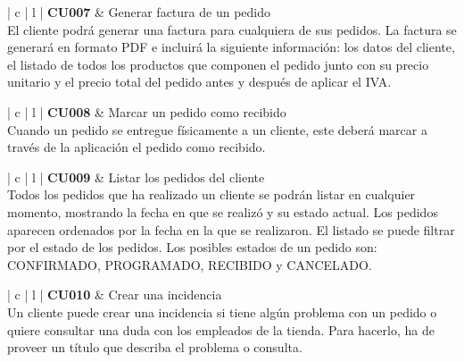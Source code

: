 \documentclass[11pt,spanish,listoffigures]{tfgetsinf}
\begin{document}
\begin{center}
\begin{tabular}{ | c | l | }
\hline
\textbf{ CU007 } & Generar factura de un pedido \\
\hline
{}
{
El cliente podrá generar una factura para cualquiera de sus pedidos. La factura se generará en formato PDF e incluirá la siguiente información: los datos del cliente, el listado de todos los productos que componen el pedido junto con su precio unitario y el precio total del pedido antes y después de aplicar el IVA.
} \\
\hline
\end{tabular}
\end{center}

\begin{center}
\begin{tabular}{ | c | l | }
\hline
\textbf{ CU008 } & Marcar un pedido como recibido \\
\hline
{}
{
Cuando un pedido se entregue físicamente a un cliente, este deberá marcar a través de la aplicación el pedido como recibido.
} \\
\hline
\end{tabular}
\end{center}

\begin{center}
\begin{tabular}{ | c | l | }
\hline
\textbf{ CU009 } & Listar los pedidos del cliente \\
\hline
{}
{
Todos los pedidos que ha realizado un cliente se podrán listar en cualquier momento, mostrando la fecha en que se realizó y su estado actual. Los pedidos aparecen ordenados por la fecha en la que se realizaron. El listado se puede filtrar por el estado de los pedidos. Los posibles estados de un pedido son: CONFIRMADO, PROGRAMADO, RECIBIDO y CANCELADO.
} \\
\hline
\end{tabular}
\end{center}

\begin{center}
\begin{tabular}{ | c | l | }
\hline
\textbf{ CU010 } & Crear una incidencia \\
\hline
{}
{
Un cliente puede crear una incidencia si tiene algún problema con un pedido o quiere consultar una duda con los empleados de la tienda. Para hacerlo, ha de proveer un título que describa el problema o consulta.
} \\
\hline
\end{tabular}
\end{center}
\end{document}
